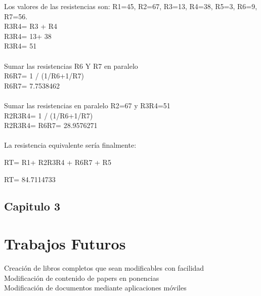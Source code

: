\documentclass[10pt]{article}\usepackage[]{graphicx}\usepackage[]{color}
\begin{document}
\begin{enumerate}
Los valores de las resistencias son: R1=45, R2=67, R3=13, R4=38, R5=3, R6=9, R7=56.\\



R3R4= R3 + R4\\
R3R4= 13+ 38\\
R3R4= 51\\\\

Sumar las resistencias R6 Y R7 en paralelo\\



R6R7= 1 / (1/R6+1/R7)\\
R6R7= 7.7538462\\\\

Sumar las resistencias en paralelo R2=67 y R3R4=51\\



R2R3R4= 1 / (1/R6+1/R7)\\
R2R3R4= R6R7= 28.9576271\\\\

La resistencia equivalente sería finalmente:

RT= R1+ R2R3R4 + R6R7 + R5


RT= 84.7114733

\end{enumerate}
	
	\subsection{Capitulo 3}
	

  \newpage
  
\section{Trabajos Futuros }
Creación de libros completos que sean modificables con facilidad\\
Modificación de contenido de papers en ponencias\\
Modificación de documentos mediante aplicaciones móviles
\end{document}
